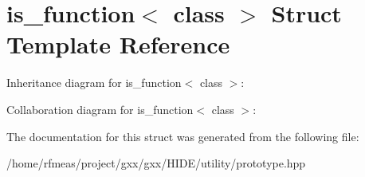 \hypertarget{structis__function}{}\section{is\+\_\+function$<$ class $>$ Struct Template Reference}
\label{structis__function}


Inheritance diagram for is\+\_\+function$<$ class $>$\+:


Collaboration diagram for is\+\_\+function$<$ class $>$\+:


The documentation for this struct was generated from the following file\+:\begin{DoxyCompactItemize}
\item 
/home/rfmeas/project/gxx/gxx/\+H\+I\+D\+E/utility/prototype.\+hpp\end{DoxyCompactItemize}
